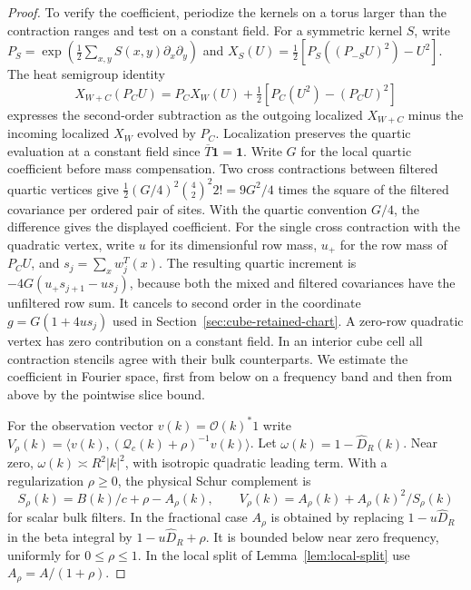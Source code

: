 \documentclass[11pt]{article}
\theoremstyle{definition}
\newcommand{\one}{\mathbf 1}
\begin{document}
\begin{proof}
To verify the coefficient, periodize the kernels on a torus larger
than the contraction ranges and test on a constant field. For a
symmetric kernel \(S\), write
\(P_S=\exp(\tfrac12\sum_{x,y} S(x,y)\partial_x\partial_y)\) and
\(X_S(U)=\tfrac12[P_S((P_{-S}U)^2)-U^2]\).
The heat semigroup identity
\begin{equation}
 X_{W+C}(P_CU)=P_C X_W(U)+\tfrac12[P_C(U^2)-(P_CU)^2]
\end{equation}
expresses the second-order subtraction as the outgoing localized
\(X_{W+C}\) minus the incoming localized \(X_W\) evolved by \(P_C\).
Localization preserves the quartic evaluation at a constant field
since \(\overline T\one=\one\). Write \(G\) for the local quartic
coefficient before mass compensation. Two cross contractions between filtered
quartic vertices give
\(\tfrac12(G/4)^2\binom42^2 2!=9G^2/4\) times the square of the
filtered covariance per ordered pair of sites. With the quartic
convention \(G/4\), the difference gives the displayed coefficient.
For the single cross contraction with the quadratic vertex, write
\(u\) for its dimensionful row mass, \(u_+\) for the row mass of
\(P_CU\), and \(s_j=\sum_x w_j^T(x)\). The resulting quartic
increment is \(-4G(u_+s_{j+1}-us_j)\), because both the mixed and
filtered covariances have the unfiltered row sum. It cancels to
second order in the coordinate \(g=G(1+4u s_j)\) used in
Section~\ref{sec:cube-retained-chart}.
A zero-row quadratic vertex has zero contribution on a constant field.
In an interior cube cell all contraction stencils agree with their
bulk counterparts. We estimate the
coefficient in Fourier space, first from below on a frequency band and
then from above by the pointwise slice bound.

For the observation vector \(v(k)=\mathcal O(k)^*1\) write
\(V_\rho(k)=\langle v(k),(\mathcal Q_c(k)+\rho)^{-1}v(k)\rangle\).
Let \(\omega(k)=1-\widehat D_R(k)\). Near zero,
\(\omega(k)\asymp R^2|k|^2\), with isotropic quadratic leading
term. With a regularization \(\rho\ge0\), the physical Schur
complement is
\begin{equation}
 S_\rho(k)=B(k)/c+\rho-A_\rho(k),
 \qquad
 V_\rho(k)=A_\rho(k)+A_\rho(k)^2/S_\rho(k)
\end{equation}
for scalar bulk filters. In the fractional case \(A_\rho\) is
obtained by replacing \(1-u\widehat D_R\) in the beta integral
by \(1-u\widehat D_R+\rho\). It is bounded below near
zero frequency, uniformly for \(0\le\rho\le1\). In the local
split of Lemma~\ref{lem:local-split} use
\(A_\rho=A/(1+\rho)\).


\end{proof}
\end{document}
